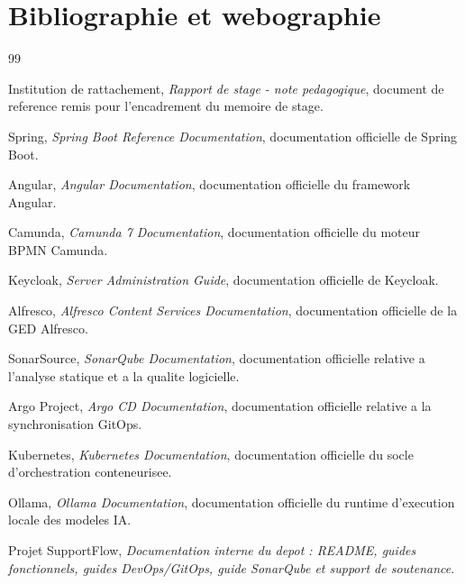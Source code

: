 \chapter*{Bibliographie et webographie}

\begin{thebibliography}{99}

Institution de rattachement, \textit{Rapport de stage - note pedagogique}, document de reference remis pour l'encadrement du memoire de stage.

Spring, \textit{Spring Boot Reference Documentation}, documentation officielle de Spring Boot.

Angular, \textit{Angular Documentation}, documentation officielle du framework Angular.

Camunda, \textit{Camunda 7 Documentation}, documentation officielle du moteur BPMN Camunda.

Keycloak, \textit{Server Administration Guide}, documentation officielle de Keycloak.

Alfresco, \textit{Alfresco Content Services Documentation}, documentation officielle de la GED Alfresco.

SonarSource, \textit{SonarQube Documentation}, documentation officielle relative a l'analyse statique et a la qualite logicielle.

Argo Project, \textit{Argo CD Documentation}, documentation officielle relative a la synchronisation GitOps.

Kubernetes, \textit{Kubernetes Documentation}, documentation officielle du socle d'orchestration conteneurisee.

Ollama, \textit{Ollama Documentation}, documentation officielle du runtime d'execution locale des modeles IA.

Projet SupportFlow, \textit{Documentation interne du depot : README, guides fonctionnels, guides DevOps/GitOps, guide SonarQube et support de soutenance}.

\end{thebibliography}
